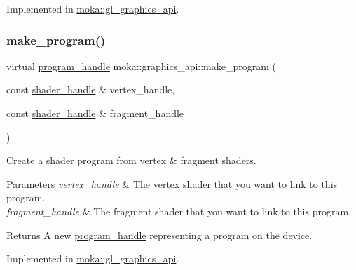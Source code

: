 Implemented in \mbox{\hyperlink{classmoka_1_1gl__graphics__api_a553669863538cbfab92a98f0f38c0040}{moka\+::gl\+\_\+graphics\+\_\+api}}.

\mbox{\label{classmoka_1_1graphics__api_a8477dfbb8aad44e0828114c68fc21792}} 
\subsubsection{\texorpdfstring{make\_program()}{make\_program()}}
{\footnotesize\ttfamily virtual \mbox{\hyperlink{structmoka_1_1program__handle}{program\+\_\+handle}} moka\+::graphics\+\_\+api\+::make\+\_\+program (\begin{DoxyParamCaption}\item[{const \mbox{\hyperlink{structmoka_1_1shader__handle}{shader\+\_\+handle}} \&}]{vertex\+\_\+handle,  }\item[{const \mbox{\hyperlink{structmoka_1_1shader__handle}{shader\+\_\+handle}} \&}]{fragment\+\_\+handle }\end{DoxyParamCaption})\hspace{0.3cm}{\ttfamily [pure virtual]}}



Create a shader program from vertex \& fragment shaders. 


\begin{DoxyParams}{Parameters}
{\em vertex\+\_\+handle} & The vertex shader that you want to link to this program. \\
\hline
{\em fragment\+\_\+handle} & The fragment shader that you want to link to this program. \\
\hline
\end{DoxyParams}
\begin{DoxyReturn}{Returns}
A new \mbox{\hyperlink{structmoka_1_1program__handle}{program\+\_\+handle}} representing a program on the device. 
\end{DoxyReturn}


Implemented in \mbox{\hyperlink{classmoka_1_1gl__graphics__api_a41f333c5adcb85036c2d0246a586ec78}{moka\+::gl\+\_\+graphics\+\_\+api}}.

\mbox{\label{classmoka_1_1graphics__api_ad1dd3ca0c1bd1477d2f40d3fae8b1956}} 
